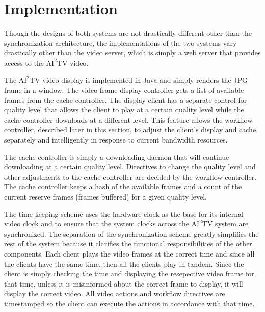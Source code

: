 \documentclass{sig-alternate}
\begin{document}
\section{Implementation} \label{implementation}

Though the designs of both systems are not drastically different other
than the synchronization architecture, the implementations of the two
systems vary drastically other than the video server, which is simply
a web server that provides access to the $\mathrm{AI}^2$TV video.

The $\mathrm{AI}^2$TV video display is implemented in Java and simply
renders the JPG frame in a window.  The video frame display controller
gets a list of available frames from the cache controller.  The
display client has a separate control for quality level that allows
the client to play at a certain quality level while the cache
controller downloads at a different level.  This feature allows the
workflow controller, described later in this section, to adjust the
client's display and cache separately and intelligently in response to
current bandwidth resources.

The cache controller is simply a downloading daemon that will continue
downloading at a certain quality level.  Directives to change the
quality level and other adjustments to the cache controller are
decided by the workflow controller.  The cache controller keeps a hash
of the available frames and a count of the current reserve frames
(frames buffered) for a given quality level.


The time keeping scheme uses the hardware clock as the base for its
internal video clock and  to ensure that the system clocks across
the $\mathrm{AI}^2$TV system are synchronized.  The separation of the
synchronization scheme greatly simplifies the rest of the system
because it clarifies the functional responsibilities of the other
components.  Each client plays the video frames at the correct time
and since all the clients have the same time, then all the clients
play in tandem.  Since the client is simply checking the time and
displaying the resepective video frame for that time, unless it is
misinformed about the correct frame to display, it will display the
correct video.  All video actions and workflow directives are
timestamped so the client can execute the actions in accordance with
that time.
\end{document}
